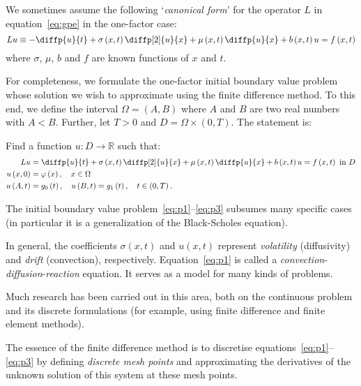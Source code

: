 \begin{frame}[t]{\subsecname}
We sometimes assume the following `\emph{canonical form}' for the operator $L$ in equation~\eqref{eq:gpe} in the one-factor case:
\begin{equation}
Lu\equiv-\diffp{u}{t}+\sigma\left(x,t\right)\diffp[2]{u}{x}+\mu\left(x,t\right)\diffp{u}{x}+b\left(x,t\right)u=f\left(x,t\right)
\end{equation}
where $\sigma$, $\mu$, $b$ and $f$ are known functions of $x$ and $t$.

For completeness, we formulate the one-factor initial boundary value problem whose solution we wish to approximate using the finite difference method. To this end, we define the interval $\Omega=\left(A,B\right)$ where $A$ and $B$ are two real numbers with $A<B$. Further, let $T>0$ and $D=\Omega\times\left(0,T\right)$. The statement is:

Find a function $u\colon D\rightarrow\mathbb{R}$ such that:
\begin{align}\label{eq:p1}
Lu&=\diffp{u}{t}+\sigma\left(x,t\right)\diffp[2]{u}{x}+\mu\left(x,t\right)\diffp{u}{x}+b\left(x,t\right)u=f\left(x,t\right)\text{ in }D\\\label{eq:p2}
u\left(x,0\right)&=\varphi\left(x\right),\quad x\in\Omega\\\label{eq:p3}
u\left(A,t\right)&=g_{0}\left(t\right),\quad u\left(B,t\right)=g_{1}\left(t\right),\quad t\in\left(0,T\right).
\end{align}
\end{frame}

\begin{frame}[t]{\subsecname}
The initial boundary value problem~\eqref{eq:p1}--\eqref{eq:p3} subsumes many specific cases (in particular it is a generalization of the Black-Scholes equation).

In general, the coefficients $\sigma\left(x,t\right)$ and $u\left(x,t\right)$ represent \emph{volatility} (diffusivity) and \emph{drift} (convection), respectively. Equation~\eqref{eq:p1} is called a \emph{convection}-\emph{diffusion}-\emph{reaction} equation. It serves as a model for many kinds of problems.

Much research has been carried out in this area, both on the continuous problem and its discrete formulations (for example, using finite difference and finite element methods).

The essence of the finite difference method is to discretise equations~\eqref{eq:p1}--\eqref{eq:p3} by defining \emph{discrete mesh points} and approximating the derivatives of the unknown solution of this system at these mesh points.
\end{frame}

